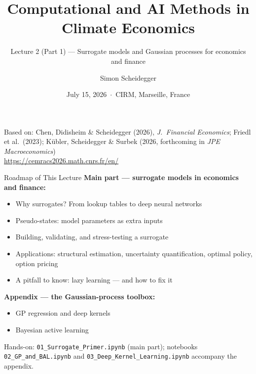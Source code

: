 \documentclass[aspectratio=169,11pt]{beamer}
\title[CEMRACS 2026 $\cdot$ Surrogates]
{Computational and AI Methods in Climate Economics}
\subtitle{Lecture 2 (Part 1) --- Surrogate models and Gaussian processes for economics and finance}
\author{Simon Scheidegger}
\institute{HEC Lausanne $\cdot$ Grantham Research Institute, LSE}
\date{July 15, 2026 \,$\cdot$\, CIRM, Marseille, France}
\newcommand{\emphc}[1]{\textcolor{harvardcrimson}{#1}}
\begin{document}
\newcommand{\exercisepause}{%
  \tikz[baseline=(X.base)]{\node[fill=darkgreen!80!black, text=white,
  rounded corners=2pt, inner sep=3pt, font=\scriptsize\bfseries](X){PAUSE --- 5 min};}}

{
\begin{frame}
\titlepage
\vspace{-0.4cm}
\begin{center}
{\footnotesize Based on: Chen, Didisheim \& Scheidegger (2026), \emph{J.\ Financial Economics}; Friedl et al.\ (2023); K\"ubler, Scheidegger \& Surbek (2026, forthcoming in \emph{JPE Macroeconomics})}\\[8pt]
{\footnotesize \url{https://cemracs2026.math.cnrs.fr/en/}}
\end{center}
\end{frame}
}

\begin{frame}{Roadmap of This Lecture}
\textbf{Main part --- surrogate models in economics and finance:}
\begin{itemize}\itemsep2pt
  \item Why surrogates? From lookup tables to deep neural networks
  \item Pseudo-states: model parameters as extra inputs
  \item Building, validating, and stress-testing a surrogate
  \item Applications: structural estimation, uncertainty quantification, optimal policy, option pricing
  \item A pitfall to know: \emphc{lazy learning} --- and how to fix it
\end{itemize}

\vspace{0.4em}
\textbf{Appendix --- the Gaussian-process toolbox:}
\begin{itemize}\itemsep2pt
  \item GP regression and deep kernels
  \item Bayesian active learning
\end{itemize}

\vspace{0.3em}
\begin{center}
{\scriptsize Hands-on: \texttt{01\_Surrogate\_Primer.ipynb} (main part); notebooks \texttt{02\_GP\_and\_BAL.ipynb} and \texttt{03\_Deep\_Kernel\_Learning.ipynb} accompany the appendix.}
\end{center}
\end{frame}
\end{document}
